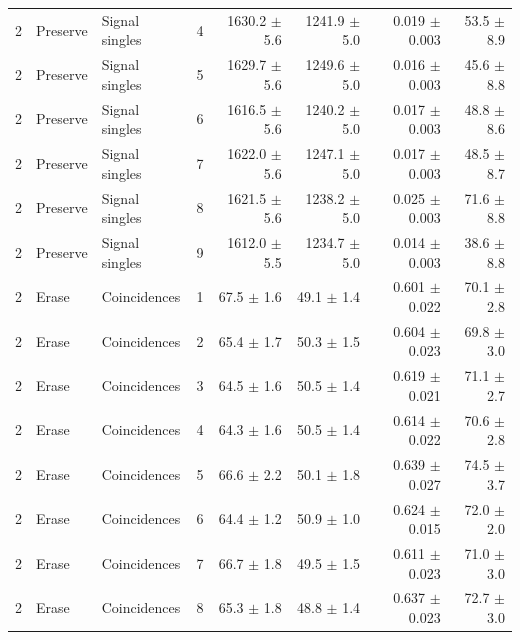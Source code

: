 \begin{tabular}{llllrrrr}
2 & Preserve & Signal singles & 4 & 1630.2 \ensuremath{\pm} 5.6 & 1241.9 \ensuremath{\pm} 5.0 & 0.019 \ensuremath{\pm} 0.003 & 53.5 \ensuremath{\pm} 8.9 \\
2 & Preserve & Signal singles & 5 & 1629.7 \ensuremath{\pm} 5.6 & 1249.6 \ensuremath{\pm} 5.0 & 0.016 \ensuremath{\pm} 0.003 & 45.6 \ensuremath{\pm} 8.8 \\
2 & Preserve & Signal singles & 6 & 1616.5 \ensuremath{\pm} 5.6 & 1240.2 \ensuremath{\pm} 5.0 & 0.017 \ensuremath{\pm} 0.003 & 48.8 \ensuremath{\pm} 8.6 \\
2 & Preserve & Signal singles & 7 & 1622.0 \ensuremath{\pm} 5.6 & 1247.1 \ensuremath{\pm} 5.0 & 0.017 \ensuremath{\pm} 0.003 & 48.5 \ensuremath{\pm} 8.7 \\
2 & Preserve & Signal singles & 8 & 1621.5 \ensuremath{\pm} 5.6 & 1238.2 \ensuremath{\pm} 5.0 & 0.025 \ensuremath{\pm} 0.003 & 71.6 \ensuremath{\pm} 8.8 \\
2 & Preserve & Signal singles & 9 & 1612.0 \ensuremath{\pm} 5.5 & 1234.7 \ensuremath{\pm} 5.0 & 0.014 \ensuremath{\pm} 0.003 & 38.6 \ensuremath{\pm} 8.8 \\
\midrule
2 & Erase & Coincidences & 1 & 67.5 \ensuremath{\pm} 1.6 & 49.1 \ensuremath{\pm} 1.4 & 0.601 \ensuremath{\pm} 0.022 & 70.1 \ensuremath{\pm} 2.8 \\
2 & Erase & Coincidences & 2 & 65.4 \ensuremath{\pm} 1.7 & 50.3 \ensuremath{\pm} 1.5 & 0.604 \ensuremath{\pm} 0.023 & 69.8 \ensuremath{\pm} 3.0 \\
2 & Erase & Coincidences & 3 & 64.5 \ensuremath{\pm} 1.6 & 50.5 \ensuremath{\pm} 1.4 & 0.619 \ensuremath{\pm} 0.021 & 71.1 \ensuremath{\pm} 2.7 \\
2 & Erase & Coincidences & 4 & 64.3 \ensuremath{\pm} 1.6 & 50.5 \ensuremath{\pm} 1.4 & 0.614 \ensuremath{\pm} 0.022 & 70.6 \ensuremath{\pm} 2.8 \\
2 & Erase & Coincidences & 5 & 66.6 \ensuremath{\pm} 2.2 & 50.1 \ensuremath{\pm} 1.8 & 0.639 \ensuremath{\pm} 0.027 & 74.5 \ensuremath{\pm} 3.7 \\
2 & Erase & Coincidences & 6 & 64.4 \ensuremath{\pm} 1.2 & 50.9 \ensuremath{\pm} 1.0 & 0.624 \ensuremath{\pm} 0.015 & 72.0 \ensuremath{\pm} 2.0 \\
2 & Erase & Coincidences & 7 & 66.7 \ensuremath{\pm} 1.8 & 49.5 \ensuremath{\pm} 1.5 & 0.611 \ensuremath{\pm} 0.023 & 71.0 \ensuremath{\pm} 3.0 \\
2 & Erase & Coincidences & 8 & 65.3 \ensuremath{\pm} 1.8 & 48.8 \ensuremath{\pm} 1.4 & 0.637 \ensuremath{\pm} 0.023 & 72.7 \ensuremath{\pm} 3.0 \\

\end{tabular}

